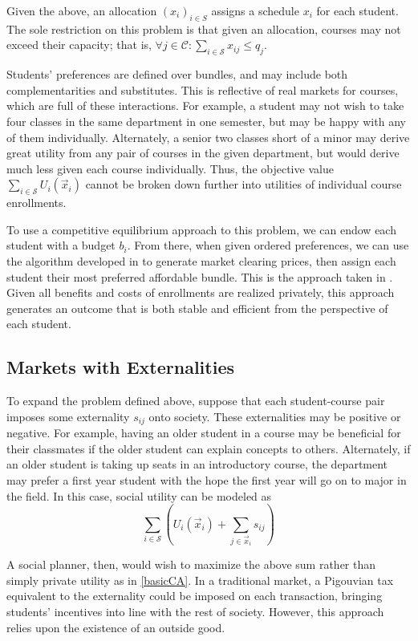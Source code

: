 \documentclass{article}
\begin{document}
Given the above, an allocation $(x_i)_{i \in S}$ assigns a schedule $x_i$ for each student. The sole restriction on this problem is that given an allocation, courses may not exceed their capacity; that is, $\forall j \in \mathcal{C} : \sum_{i \in \mathcal{S}} x_{ij} \leq q_j$.

Students' preferences are defined over bundles, and may include both complementarities and substitutes. This is reflective of real markets for courses, which are full of these interactions. For example, a student may not wish to take four classes in the same department in one semester, but may be happy with any of them individually. Alternately, a senior two classes short of a minor may derive great utility from any pair of courses in the given department, but would derive much less given each course individually. Thus, the objective value $\sum_{i \in \mathcal{S}} U_i(\vec{x}_i)$ cannot be broken down further into utilities of individual course enrollments.

To use a competitive equilibrium approach to this problem, we can endow each student with a budget $b_i$. From there, when given ordered preferences, we can use the algorithm developed in \textcite{othman2010} to generate market clearing prices, then assign each student their most preferred affordable bundle. This is the approach taken in \textcite{budish2011}. Given all benefits and costs of enrollments are realized privately, this approach generates an outcome that is both stable and efficient from the perspective of each student.

\subsection{Markets with Externalities}

\label{ext}

To expand the problem defined above, suppose that each student-course pair imposes some externality $s_{ij}$ onto society. These externalities may be positive or negative. For example, having an older student in a course may be beneficial for their classmates if the older student can explain concepts to others. Alternately, if an older student is taking up seats in an introductory course, the department may prefer a first year student with the hope the first year will go on to major in the field. In this case, social utility can be modeled as $$\sum_{i \in \mathcal{S}} \left(U_i(\vec{x}_i) + \sum_{j \in \vec{x}_i} s_{ij} \right)$$

A social planner, then, would wish to maximize the above sum rather than simply private utility as in \ref{basicCA}. In a traditional market, a Pigouvian tax equivalent to the externality could be imposed on each transaction, bringing students' incentives into line with the rest of society. However, this approach relies upon the existence of an outside good.  
\end{document}
